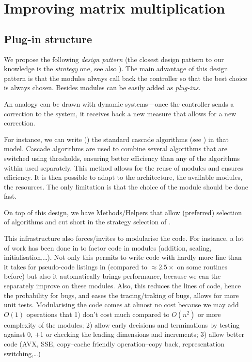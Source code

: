 \section{Improving \linbox matrix multiplication}\label{sec:matmul}
%
%
\subsection{Plug-in structure}
%
We propose the following \emph{design pattern} (the closest design pattern to our
knowledge is the \emph{strategy} one, see also \cite[Fig 2.]{Cung:2006:TC}).
The main advantage of this design pattern is that the modules always call back
the controller so that the best choice is always chosen.  Besides modules can
be easily added as \emph{plug-ins}.
%

%
An analogy can be drawn with dynamic
systems---once the controller sends a correction to the system, it receives
back a new measure that allows for a new correction.
%
%
%
\par
%
For instance, we can write () the standard cascade algorithms
(see \cite{Dumas:2008:Flas}) in that model. Cascade algorithms are used to combine
several algorithms that are switched using thresholds, ensuring better
efficiency than any of the algorithms within used separately.
%
%
%
This method allows for the reuse of modules and ensures efficiency.
It is then possible to adapt to the architecture, the available modules,
the resources. The only limitation is that the choice of the module
should be done fast.
%

\par
%
On top of this design, we have Methods/Helpers that allow (preferred) selection
of algorithms and cut short in the strategy selection of .
%
%
%
\par
%
This infrastructure also forces/invites to modularise the code. For instance, a lot
of work has been done in \fflasffpack to factor code in modules (addition,
scaling, initialisation,\ldots). Not only this permits to write code with
hardly more line than it takes for pseudo-code listings in
\cite{Boyer:2009:sched} (compared to $\approx 2.5\times$ on some routines
before) but also it automatically brings performance, because we can the
separately improve on these modules. Also, this reduces the lines of code,
hence the probability for bugs, and eases the tracing/traking of bugs, allows
for more unit tests. Modularising the code comes at almost no cost because we
may add $O(1)$  operations that 1) don't cost much compared to $O(n^2)$ or more
complexity of the modules; 2) allow early decisions and terminations by testing
against $0$, $\pm 1$ or checking the leading dimensions and increments; 3)
allow better code (AVX, SSE, copy--cache friendly operation--copy back,
representation switching,\ldots)
%
